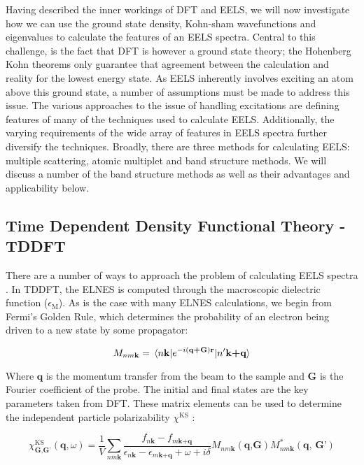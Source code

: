 
Having described the inner workings of DFT and EELS, we will now investigate how we can use the ground state density, Kohn-sham wavefunctions and eigenvalues to calculate the features of an EELS spectra.  Central to this challenge, is the fact that DFT is however a ground state theory; the Hohenberg Kohn theorems only guarantee that agreement between the calculation and reality for the lowest energy state. As EELS inherently involves exciting an atom above this ground state, a number of assumptions must be made to address this issue. The various approaches to the issue of handling excitations are defining features of many of the techniques used to calculate EELS.  Additionally, the varying requirements of the wide array of features in EELS spectra further diversify the techniques. Broadly, there are three methods for calculating EELS: multiple scattering, atomic multiplet and band structure methods.  We will discuss a number of the band structure methods as well as their advantages and applicability below.


\subsection{Time Dependent Density Functional Theory -TDDFT}
There are a number of ways to approach the problem of calculating EELS spectra \cite {optic, adler_quantum_1962}. In TDDFT, the ELNES is computed through the macroscopic dielectric function ($\epsilon_{\mathrm{M}}$). As is the case with many ELNES calculations, we begin from Fermi's Golden Rule, which determines the probability of an electron being driven to a new state by some propagator:

\begin{equation}
M_{nm\textbf{k}} = \mel{n\textbf{k}}{e^{-i(\textbf{q+G})\textbf{r}}}{n'\textbf{k+q}}
\label{FGR}
\end{equation}

Where $\textbf{q}$ is the momentum transfer from the beam to the sample and \textbf{G} is the Fourier coefficient of the probe. The initial and final states are the key parameters taken from DFT.  These matrix elements can be used to determine the independent particle polarizability $\chi^{\mathrm{KS}}$ \cite{exciting}: 


\begin{equation}
\chi^{\mathrm{KS}}_{\mathrm{\textbf{G,G'}}}(\textbf{q},\omega)=\frac{1}{V}\sum_{nm\textbf{k}}\frac{f_{n\textbf{k}}-f_{m\textbf{k+q}}}{\epsilon_{n\textbf{k}}-\epsilon_{m\textbf{k+q}}+\omega + i\delta} M_{nm\textbf{k}}(\textbf{q,G})M^*_{nm\textbf{k}}(\textbf{q, G'})
\end{equation}

